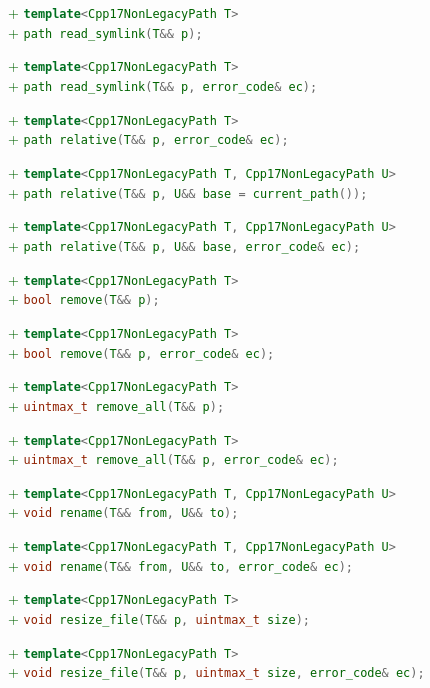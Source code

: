 \documentclass[11pt]{article}
\newcommand{\code}[2][cpp]{\lstinline[language=#1,basicstyle=\small\ttfamily]{#2}}
\newcommand{\tsreplace}[3]{\textcolor{red}{\sout{#1}}#2\textcolor{darkgreen}{#3}}
\begin{document}
\tsreplace{}{}{+ \code{template<Cpp17NonLegacyPath T>}}\\
\tsreplace{}{}{+ \code{path read_symlink(T&& p);}}

\tsreplace{}{}{+ \code{template<Cpp17NonLegacyPath T>}}\\
\tsreplace{}{}{+ \code{path read_symlink(T&& p, error_code& ec);}}

\tsreplace{}{}{+ \code{template<Cpp17NonLegacyPath T>}}\\
\tsreplace{}{}{+ \code{path relative(T&& p, error_code& ec);}}

\tsreplace{}{}{+ \code{template<Cpp17NonLegacyPath T, Cpp17NonLegacyPath U>}}\\
\tsreplace{}{}{+ \code{path relative(T&& p, U&& base = current_path());}}

\tsreplace{}{}{+ \code{template<Cpp17NonLegacyPath T, Cpp17NonLegacyPath U>}}\\
\tsreplace{}{}{+ \code{path relative(T&& p, U&& base, error_code& ec);}}

\tsreplace{}{}{+ \code{template<Cpp17NonLegacyPath T>}}\\
\tsreplace{}{}{+ \code{bool remove(T&& p);}}

\tsreplace{}{}{+ \code{template<Cpp17NonLegacyPath T>}}\\
\tsreplace{}{}{+ \code{bool remove(T&& p, error_code& ec);}}

\tsreplace{}{}{+ \code{template<Cpp17NonLegacyPath T>}}\\
\tsreplace{}{}{+ \code{uintmax_t remove_all(T&& p);}}

\tsreplace{}{}{+ \code{template<Cpp17NonLegacyPath T>}}\\
\tsreplace{}{}{+ \code{uintmax_t remove_all(T&& p, error_code& ec);}}

\tsreplace{}{}{+ \code{template<Cpp17NonLegacyPath T, Cpp17NonLegacyPath U>}}\\
\tsreplace{}{}{+ \code{void rename(T&& from, U&& to);}}

\tsreplace{}{}{+ \code{template<Cpp17NonLegacyPath T, Cpp17NonLegacyPath U>}}\\
\tsreplace{}{}{+ \code{void rename(T&& from, U&& to, error_code& ec);}}

\tsreplace{}{}{+ \code{template<Cpp17NonLegacyPath T>}}\\
\tsreplace{}{}{+ \code{void resize_file(T&& p, uintmax_t size);}}

\tsreplace{}{}{+ \code{template<Cpp17NonLegacyPath T>}}\\
\tsreplace{}{}{+ \code{void resize_file(T&& p, uintmax_t size, error_code& ec);}}
\end{document}
